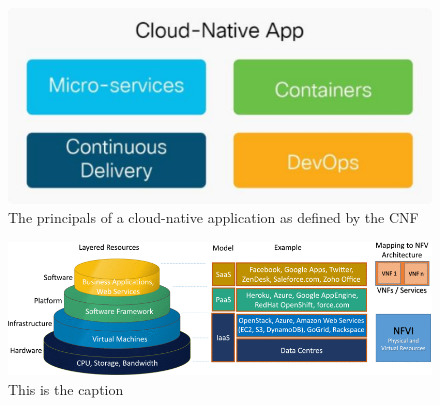 \begin{figure}
	\centering
	\includegraphics[width=0.75\linewidth]{images/cloudNativeApp.png}
	\caption{The principals of a cloud-native application as defined by the CNF \cite{CNF}}
	\label{img:cloudNativeApp}
\end{figure}

\begin{figure}
	\centering
	\includegraphics[width=1\linewidth]{images/arch.png}
	\caption{This is the caption \cite{mijumbi2016network}}
	\label{img:arch}
\end{figure}

